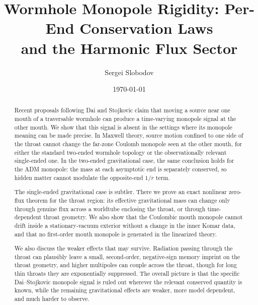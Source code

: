 \documentclass[aps,prd,onecolumn,nofootinbib,superscriptaddress]{revtex4-2}
\begin{document}
\title{Wormhole Monopole Rigidity: Per-End Conservation Laws\\
and the Harmonic Flux Sector}

\author{Sergei Slobodov}
\noaffiliation

\date{\today}

\begin{abstract}
Recent proposals following Dai and Stojkovic claim that moving a source near
one mouth of a traversable wormhole can produce a time-varying monopole signal
at the other mouth.  We show that this signal is absent in the settings where
its monopole meaning can be made precise.  In Maxwell theory, source motion
confined to one side of the throat cannot change the far-zone Coulomb monopole
seen at the other mouth, for either the standard two-ended wormhole topology or
the observationally relevant single-ended one.  In the two-ended gravitational
case, the same conclusion holds for the ADM monopole: the mass at each
asymptotic end is separately conserved, so hidden matter cannot modulate the
opposite-end $1/r$ term.

The single-ended gravitational case is subtler.  There we prove an exact
nonlinear zero-flux theorem for the throat region: its effective gravitational
mass can change only through genuine flux across a worldtube enclosing the
throat, or through time-dependent throat geometry.  We also show that the Coulombic mouth
monopole cannot drift inside a stationary-vacuum exterior without a change in
the inner Komar data, and that no first-order mouth monopole is generated in
the linearized theory.

We also discuss the weaker effects that may survive.  Radiation passing through
the throat can plausibly leave a small, second-order, negative-sign memory
imprint on the throat geometry, and higher multipoles can couple across the
throat, though for long thin throats they are exponentially suppressed.  The
overall picture is that the specific Dai--Stojkovic monopole signal is ruled
out wherever the relevant conserved quantity is known, while the remaining
gravitational effects are weaker, more model dependent, and much harder to
observe.
\end{abstract}

\maketitle

\end{document}
